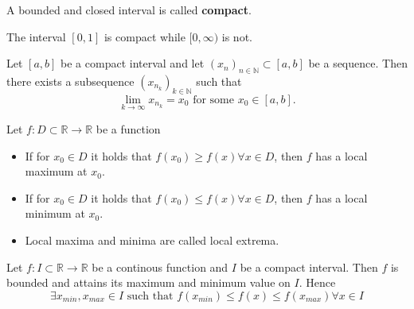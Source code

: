 \begin{definition}
A bounded and closed interval is called \textbf{compact}.
\end{definition}

\begin{example}
    The interval $[0, 1]$ is compact while $[0, \infty)$ is not.
\end{example}

\begin{lemma}
    Let $[a, b]$ be a compact interval and let $(x_n)_{n\in\mathbb{N}} \subset [a, b]$ be a sequence. Then there exists a subsequence $(x_{n_k})_{k\in\mathbb{N}}$ such that 
    $$\lim_{k\to\infty} x_{n_k} = x_0 \text{ for some } x_0 \in [a, b].$$
\end{lemma}

\begin{definition}
    Let $f: D \subset \mathbb{R} \to \mathbb{R}$ be a function
    \begin{itemize}
        \item If for $x_0 \in D$ it holds that $f(x_0) \geq f(x) \forall x \in D$, then $f$ has a local maximum at $x_0$.
        \item If for $x_0 \in D$ it holds that $f(x_0) \leq f(x) \forall x \in D$, then $f$ has a local minimum at $x_0$.
        \item Local maxima and minima are called local extrema.
    \end{itemize}
\end{definition}

\begin{theorem}
    Let $f: I \subset \mathbb{R} \to \mathbb{R}$ be a continous function and $I$ be a compact interval. Then $f$ is bounded and attains its maximum and minimum value on $I$. Hence
    $$\exists x_{min}, x_{max} \in I \text{ such that } f(x_{min}) \leq f(x) \leq f(x_{max}) \forall x \in I$$
\end{theorem}

